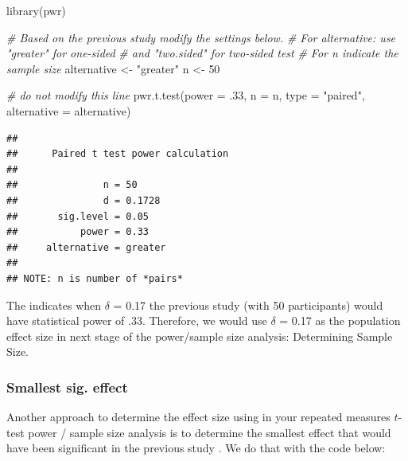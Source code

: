 \documentclass[
]{krantz}
\makeatletter
\newenvironment{Shaded}{\begin{snugshade}}{\end{snugshade}}
\newcommand{\AttributeTok}[1]{\textcolor[rgb]{0.61,0.61,0.61}{#1}}
\newcommand{\CommentTok}[1]{\textcolor[rgb]{0.37,0.37,0.37}{\textit{#1}}}
\newcommand{\DecValTok}[1]{\textcolor[rgb]{0.06,0.06,0.06}{#1}}
\newcommand{\FunctionTok}[1]{\textcolor[rgb]{0,0,0}{#1}}
\newcommand{\NormalTok}[1]{#1}
\newcommand{\OtherTok}[1]{\textcolor[rgb]{0.37,0.37,0.37}{#1}}
\newcommand{\StringTok}[1]{\textcolor[rgb]{0.5,0.5,0.5}{#1}}
\newenvironment{kframe}{%
\medskip{}
\setlength{\fboxsep}{.8em}
 \def\at@end@of@kframe{}%
 \ifinner\ifhmode%
  \def\at@end@of@kframe{\end{minipage}}%
  \begin{minipage}{\columnwidth}%
 \fi\fi%
 \def\FrameCommand##1{\hskip\@totalleftmargin \hskip-\fboxsep
 \colorbox{shadecolor}{##1}\hskip-\fboxsep
     \hskip-\linewidth \hskip-\@totalleftmargin \hskip\columnwidth}%
 \MakeFramed {\advance\hsize-\width
   \@totalleftmargin\z@ \linewidth\hsize
   \@setminipage}}%
 {\par\unskip\endMakeFramed%
 \at@end@of@kframe}
\renewenvironment{Shaded}{\begin{kframe}}{\end{kframe}}
\makeatother
\begin{document}
\begin{Shaded}
\begin{Highlighting}[]
\FunctionTok{library}\NormalTok{(pwr)}

\CommentTok{\# Based on the previous study modify the settings below.}
\CommentTok{\# For alternative: use "greater" for one{-}sided }
\CommentTok{\# and "two.sided" for two{-}sided test}
\CommentTok{\# For n indicate the sample size}
\NormalTok{alternative }\OtherTok{\textless{}{-}} \StringTok{"greater"}
\NormalTok{n }\OtherTok{\textless{}{-}} \DecValTok{50}

\CommentTok{\# do not modify this line}
\FunctionTok{pwr.t.test}\NormalTok{(}\AttributeTok{power =}\NormalTok{ .}\DecValTok{33}\NormalTok{,}
           \AttributeTok{n =}\NormalTok{ n, }
           \AttributeTok{type =} \StringTok{"paired"}\NormalTok{,}
           \AttributeTok{alternative =}\NormalTok{ alternative)}
\end{Highlighting}
\end{Shaded}

\begin{verbatim}
## 
##      Paired t test power calculation 
## 
##               n = 50
##               d = 0.1728
##       sig.level = 0.05
##           power = 0.33
##     alternative = greater
## 
## NOTE: n is number of *pairs*
\end{verbatim}

The indicates when \(\delta\) = 0.17 the previous study (with 50 participants) would have statistical power of .33. Therefore, we would use \(\delta\) = 0.17 as the population effect size in next stage of the power/sample size analysis: Determining Sample Size.

\hypertarget{smallest-sig.-effect-1}{%
\subsubsection{Smallest sig. effect}\label{smallest-sig.-effect-1}}

Another approach to determine the effect size using in your repeated measures \(t\)-test power / sample size analysis is to determine the smallest effect that would have been significant in the previous study \citep{lakens2018equivalence}. We do that with the code below:
\end{document}

